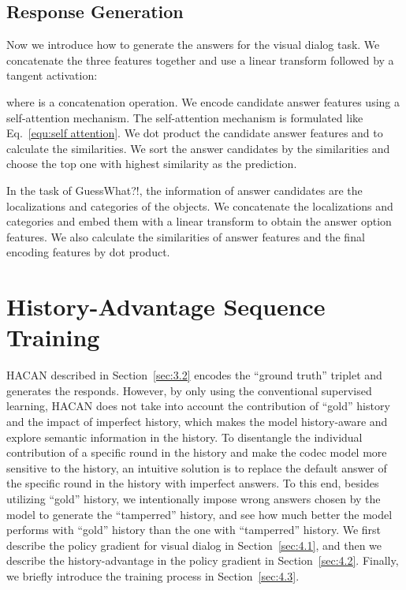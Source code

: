 \documentclass[10pt,twocolumn,letterpaper]{article}
\begin{document}
\subsection{Response Generation}\label{sec:3.3}
Now we introduce how to generate the answers for the visual dialog task. We concatenate the three features  together and use a linear transform followed by a tangent activation: 

where  is a concatenation operation.
We encode candidate answer features using a self-attention mechanism. The self-attention mechanism is formulated like Eq.~\eqref{equ:self attention}. We dot product the candidate answer features and  to calculate the similarities. We sort the answer candidates by the similarities and choose the top one with highest similarity as the prediction.

In the task of GuessWhat?!, the information of answer candidates are the localizations and categories of the objects. We concatenate the localizations and categories and embed them with a linear transform to obtain the answer option features. We also calculate the similarities of answer features and the final encoding features by dot product.
\section{History-Advantage Sequence Training}\label{sec:4}
HACAN described in Section~\ref{sec:3.2} encodes the ``ground truth'' triplet and generates the responds. However, by only using the conventional supervised learning, HACAN does not take into account the contribution of ``gold'' history and the impact of imperfect history, which makes the model history-aware and explore semantic information in the history. To disentangle the individual contribution of a specific round in the history and make the codec model more sensitive to the history, an intuitive solution is to replace the default answer of the specific round in the history with imperfect answers. To this end, besides utilizing ``gold'' history, we intentionally impose wrong answers chosen by the model to generate the ``tamperred'' history, and see how much better the model performs with ``gold'' history than the one with ``tamperred'' history. We first describe the policy gradient for visual dialog in Section~\ref{sec:4.1}, and then we describe the history-advantage in the policy gradient in Section~\ref{sec:4.2}. Finally, we briefly introduce the training process in Section~\ref{sec:4.3}.
\end{document}
